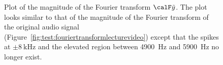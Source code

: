 \begin{figure}
\centering
\begin{shaded}
\caption{Plot of the magnitude of the Fourier transform $\calF \tilde{y}$.  The plot looks similar to that of the magnitude of the Fourier transform of the original audio signal (Figure~\ref{fig:test:fouriertransformlecturevideo}) except that the spikes at $\pm\SI{8}{\kilo\hertz}$ and the elevated region between \SI{4900}{\hertz} and \SI{5900}{\hertz} no longer exist.}\label{fig:test:fftfilteredlecturevideo}
\end{shaded}
\end{figure}





